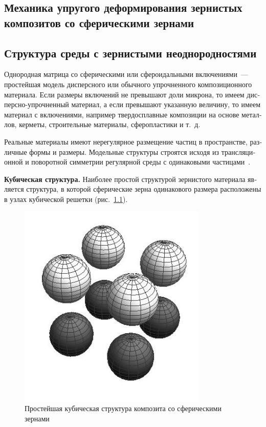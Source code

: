 
\begin{russian}
\chapter[Механика упругого деформирования зернистых композитов со сферическими зернами]{Механика упругого деформирования зернистых композитов со сферическими зернами}


\section{Структура среды с зернистыми неоднородностями}

Однородная матрица со сферическими или сфероидальными включениями~--- простейшая модель дисперсного или обычного упрочненного композиционного материала. Если размеры включений не превышают доли микрона, то имеем дисперсно-упрочненный материал, а если превышают указанную величину, то имеем материал с включениями, например твердосплавные композиции на основе металлов, керметы, строительные материалы, сферопластики и т.~д.

Реальные материалы имеют нерегулярное размещение частиц в пространстве, различные формы и размеры. Модельные структуры строятся исходя из трансляционной и поворотной симметрии регулярной среды с одинаковыми частицами~\cite{Vanin1985}.

\textbf{Кубическая структура.} Наиболее простой структурой зернистого материала является структура, в которой сферические зерна одинакового размера расположены в узлах кубической решетки (рис.~\ref{f:8:1}).{\sloppy\par}

\begin{figure}[h!]
\centering
\includegraphics[width=9cm]{cav-8.jpg}
\caption{Простейшая кубическая структура композита со сферическими зернами}
\label{f:8:1}
\end{figure}


\end{russian}
